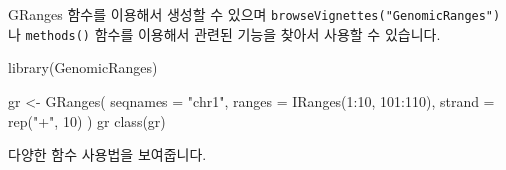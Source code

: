 \documentclass[
]{book}
\newenvironment{Shaded}{\begin{snugshade}}{\end{snugshade}}
\newcommand{\AttributeTok}[1]{\textcolor[rgb]{0.77,0.63,0.00}{#1}}
\newcommand{\DecValTok}[1]{\textcolor[rgb]{0.00,0.00,0.81}{#1}}
\newcommand{\FunctionTok}[1]{\textcolor[rgb]{0.00,0.00,0.00}{#1}}
\newcommand{\NormalTok}[1]{#1}
\newcommand{\OtherTok}[1]{\textcolor[rgb]{0.56,0.35,0.01}{#1}}
\newcommand{\SpecialCharTok}[1]{\textcolor[rgb]{0.00,0.00,0.00}{#1}}
\newcommand{\StringTok}[1]{\textcolor[rgb]{0.31,0.60,0.02}{#1}}
\begin{document}
GRanges 함수를 이용해서 생성할 수 있으며 \texttt{browseVignettes("GenomicRanges")} 나 \texttt{methods()} 함수를 이용해서 관련된 기능을 찾아서 사용할 수 있습니다.

\begin{Shaded}
\begin{Highlighting}[]
\FunctionTok{library}\NormalTok{(GenomicRanges)}


\NormalTok{gr }\OtherTok{\textless{}{-}} \FunctionTok{GRanges}\NormalTok{(}
  \AttributeTok{seqnames =} \StringTok{"chr1"}\NormalTok{, }
  \AttributeTok{ranges =} \FunctionTok{IRanges}\NormalTok{(}\DecValTok{1}\SpecialCharTok{:}\DecValTok{10}\NormalTok{, }\DecValTok{101}\SpecialCharTok{:}\DecValTok{110}\NormalTok{),}
  \AttributeTok{strand =} \FunctionTok{rep}\NormalTok{(}\StringTok{"+"}\NormalTok{, }\DecValTok{10}\NormalTok{)}
\NormalTok{)}
\NormalTok{gr}
\FunctionTok{class}\NormalTok{(gr)}
\end{Highlighting}
\end{Shaded}

다양한 함수 사용법을 보여줍니다.
\end{document}

